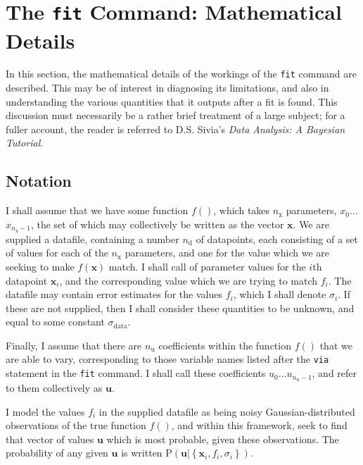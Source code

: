 \documentclass[a4paper,onecolumn,11pt]{book}
\begin{document}
\chapter{The \texttt{fit} Command: Mathematical Details}
\label{fit_math}

In this section, the mathematical details of the workings of the \texttt{fit}
command are described. This may be of interest in diagnosing its limitations,
and also in understanding the various quantities that it outputs after a fit is
found. This discussion must necessarily be a rather brief treatment of a large
subject; for a fuller account, the reader is referred to D.S. Sivia's
\textit{Data Analysis: A Bayesian Tutorial}.

\section{Notation}
\label{bayes_notation}

I shall assume that we have some function $f()$, which takes $n_\mathrm{x}$
parameters, $x_0$...$x_{n_\mathrm{x}-1}$, the set of which may collectively be
written as the vector $\mathbf{x}$. We are supplied a datafile, containing a
number $n_\mathrm{d}$ of datapoints, each consisting of a set of values for
each of the $n_\mathrm{x}$ parameters, and one for the value which we are
seeking to make $f(\mathbf{x})$ match. I shall call of parameter values for the
$i$th datapoint $\mathbf{x}_i$, and the corresponding value which we are trying
to match $f_i$. The datafile may contain error estimates for the values $f_i$,
which I shall denote $\sigma_i$. If these are not supplied, then I shall
consider these quantities to be unknown, and equal to some constant
$\sigma_\mathrm{data}$.

Finally, I assume that there are $n_\mathrm{u}$ coefficients within the
function $f()$ that we are able to vary, corresponding to those variable names
listed after the \texttt{via} statement in the \texttt{fit} command. I shall
call these coefficients $u_0$...$u_{n_\mathrm{u}-1}$, and refer to them
collectively as $\mathbf{u}$.

I model the values $f_i$ in the supplied datafile as being noisy
Gaussian-distributed observations of the true function $f()$, and within this
framework, seek to find that vector of values $\mathbf{u}$ which is most
probable, given these observations. The probability of any given $\mathbf{u}$
is written
$\mathrm{P}\left( \mathbf{u} | \left\{ \mathbf{x}_i, f_i, \sigma_i \right\} \right)$.
\end{document}
